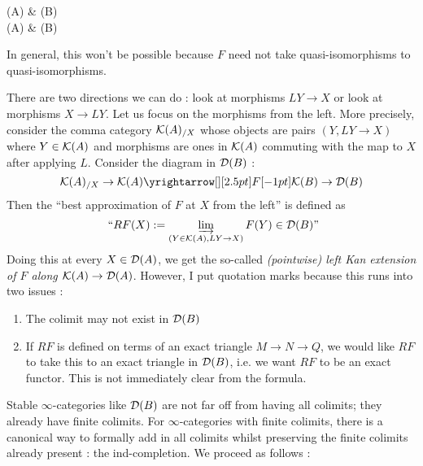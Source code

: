 \documentclass{article}
\begin{document}
\begin{center}
\end{center}
\begin{cd}
  {(A)} & {(B)} \\
	{(A)} & {(B)}
	\arrow["F", from=1-1, to=1-2]
	\arrow[from=1-1, to=2-1]
	\arrow[from=1-2, to=2-2]
	\arrow["{?}", dashed, from=2-1, to=2-2]
\end{cd}
In general, this won't be possible because
$F$ need not take quasi-isomorphisms to quasi-isomorphisms.
\begin{center}
\end{center}
There are two directions we can do : look at morphisms $LY \to X$
or look at morphisms $X \to LY$.
Let us focus on the morphisms from the left.
More precisely, consider the comma category $\mathcal{K}(A)_{/ X}$
whose objects are pairs $(Y , L Y \to X)$ where $Y \in \mathcal{K}(A)$
and morphisms are ones in $\mathcal{K}(A)$ commuting with
the map to $X$ after applying $L$.
Consider the diagram in $\mathcal{D}(B)$ : 
\[
  \cK(A)_{/X} \to \cK(A) \map{F}{} \cK(B) \to \cD(B)
\]
Then the ``best approximation of $F$ at $X$ from the left'' is defined as
\[
  \text{ ``$RF(X) := \varinjlim_{(Y \in \mathcal{K}(A) , LY \to X)} F(Y) \in \mathcal{D}(B)$''}
\]
Doing this at every $X \in \mathcal{D}(A)$, 
we get the so-called \emph{(pointwise) 
  left Kan extension of $F$ along $\mathcal{K}(A) \to \mathcal{D}(A)$}.\cite[
    \href{https://kerodon.net/tag/0300}{Tag 0300}
    ]{kerodon}
However, I put quotation marks because this runs into two issues : 
\begin{enumerate}
  \item The colimit may not exist in $\mathcal{D}(B)$
  \item If $RF$ is defined
  on terms of an exact triangle $M \to N \to Q$,
  we would like $RF$ to take this to an exact triangle in $\mathcal{D}(B)$,
  i.e. we want $RF$ to be an exact functor.
  This is not immediately clear from the formula.
\end{enumerate}
Stable $\infty$-categories like $\mathcal{D}(B)$ are not far off
from having all colimits; they already have finite colimits.
For $\infty$-categories with finite colimits,
there is a canonical way to formally add in all colimits
whilst preserving the finite colimits already present : 
the ind-completion.
We proceed as follows : 
\end{document}
